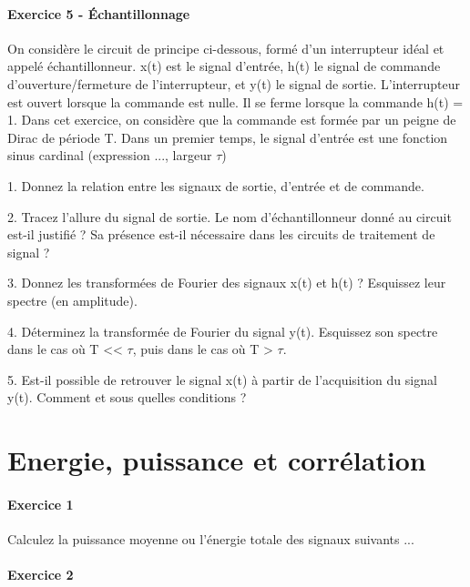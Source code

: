 \documentclass[11pt]{report}
\begin{document}
	\vspace{1\baselineskip}
	
	\subsubsection{Exercice 5 - Échantillonnage}
	
	On considère le circuit de principe ci-dessous, formé d'un interrupteur idéal et appelé échantillonneur. x(t) est le signal d'entrée, h(t) le signal de commande d'ouverture/fermeture de l'interrupteur, et y(t) le signal de sortie. L'interrupteur est ouvert lorsque la commande est nulle. Il se ferme lorsque la commande h(t) = 1.
	Dans cet exercice, on considère que la commande est formée par un peigne de Dirac de période T. Dans un premier temps, le signal d'entrée est une fonction sinus cardinal (expression ..., largeur $\tau$)
	
	1. Donnez la relation entre les signaux de sortie, d'entrée et de commande.
	
	2. Tracez l'allure du signal de sortie. Le nom d'échantillonneur donné au circuit est-il justifié ? Sa présence est-il nécessaire dans les circuits de traitement de signal ?
	
	3. Donnez les transformées de Fourier des signaux x(t) et h(t) ? Esquissez leur spectre (en amplitude).
	
	4. Déterminez la transformée de Fourier du signal y(t). Esquissez son spectre dans le cas où T << $\tau$, puis dans le cas où T > $\tau$.
	
	5. Est-il possible de retrouver le signal x(t) à partir de l'acquisition du signal y(t). Comment et sous quelles conditions ?
	
	
	\newpage
	
	\chapter{Energie, puissance et corrélation}
	
	
	\subsubsection{Exercice 1}
	
	Calculez la puissance moyenne ou l'énergie totale des signaux suivants ...
	
	\subsubsection{Exercice 2}
	
\end{document}
